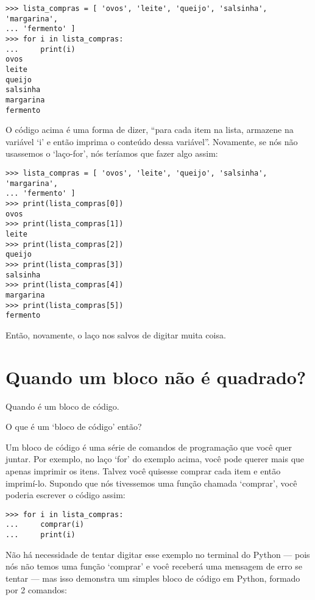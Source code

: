 \begin{listing}
\begin{verbatim}
>>> lista_compras = [ 'ovos', 'leite', 'queijo', 'salsinha', 'margarina', 
... 'fermento' ]
>>> for i in lista_compras:
...     print(i)
ovos
leite
queijo
salsinha
margarina
fermento
\end{verbatim}
\end{listing}

O código acima é uma forma de dizer, ``para cada item na lista, armazene na variável `i' e então imprima o conteúdo dessa variável''. Novamente, se nós não usassemos o `laço-for', nós teríamos que fazer algo assim:

\begin{listing}
\begin{verbatim}
>>> lista_compras = [ 'ovos', 'leite', 'queijo', 'salsinha', 'margarina', 
... 'fermento' ]
>>> print(lista_compras[0])
ovos
>>> print(lista_compras[1])
leite
>>> print(lista_compras[2])
queijo
>>> print(lista_compras[3])
salsinha
>>> print(lista_compras[4])
margarina
>>> print(lista_compras[5])
fermento
\end{verbatim}
\end{listing}

Então, novamente, o laço nos salvos de digitar muita coisa.

\section{Quando um bloco não é quadrado?}

Quando é um bloco de código.
\par
\noindent
O que é um `bloco de código' então?
\par
Um bloco de código é uma série de comandos de programação que você quer juntar. Por exemplo, no laço `for' do exemplo acima, você pode querer mais que apenas imprimir os itens. Talvez você quisesse comprar cada item e então imprimí-lo. Supondo que nós tivessemos uma função chamada `comprar', você poderia escrever o código assim:

\begin{listingignore}
\begin{verbatim}
>>> for i in lista_compras:
...     comprar(i)
...     print(i)
\end{verbatim}
\end{listingignore}

Não há necessidade de tentar digitar esse exemplo no terminal do Python --- pois nós não temos uma função `comprar' e você receberá uma mensagem de erro se tentar --- mas isso demonstra um simples bloco de código em Python, formado por 2 comandos:

